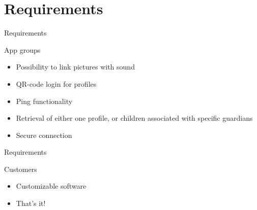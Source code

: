 \section{Requirements}
\begin{frame}{Requirements}
\pause
    \begin{block}{App groups}
        \begin{itemize}
					\pause \item Possibility to link pictures with sound
					\pause \item QR-code login for profiles
					\pause \item Ping functionality
					\pause \item Retrieval of either one profile, or children associated with specific guardians
					\pause \item Secure connection
				\end{itemize}
    \end{block}
\end{frame}
\begin{frame}{Requirements}
    \begin{block}{Customers}
        \begin{itemize}
					\pause \item Customizable software
					\pause \item That's it!
				\end{itemize}
    \end{block}
\end{frame}
